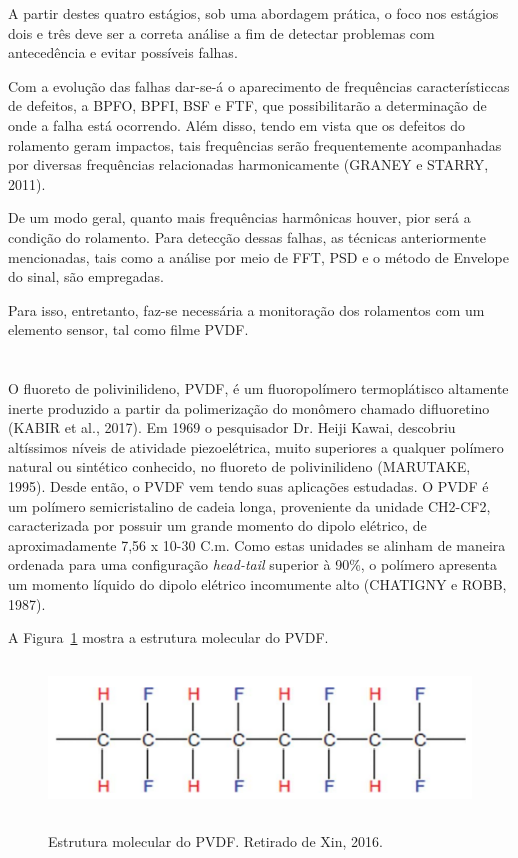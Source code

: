 \documentclass[
	12pt,				
	oneside,			
	a4paper,			
	english,			
	brazil,			
	]{abntex2ppgsi}
\begin{document}
A partir destes quatro estágios, sob uma abordagem prática, o foco nos estágios dois e três deve ser a correta análise a fim de detectar problemas com antecedência e evitar possíveis falhas. 

Com a evolução das falhas dar-se-á o aparecimento de frequências característiccas de defeitos, a BPFO, BPFI, BSF e FTF, que possibilitarão a determinação de onde a falha está ocorrendo. Além disso, tendo em vista que os defeitos do rolamento geram impactos, tais frequências serão frequentemente acompanhadas por diversas frequências relacionadas harmonicamente (GRANEY e STARRY, 2011). 

De um modo geral, quanto mais frequências harmônicas houver, pior será a condição do rolamento. Para detecção dessas falhas, as técnicas anteriormente mencionadas, tais como a análise por meio de FFT, PSD e o método de Envelope do sinal, são empregadas. 

Para isso, entretanto, faz-se necessária a monitoração dos rolamentos com um elemento sensor, tal como filme PVDF.

\newpage
\section{}
\label{secao:PVDF}

O fluoreto de polivinilideno, PVDF, é um fluoropolímero termoplátisco altamente inerte produzido a partir da polimerização do monômero chamado difluoretino (KABIR et al., 2017). Em 1969 o pesquisador Dr. Heiji Kawai, descobriu altíssimos níveis de atividade piezoelétrica, muito superiores a qualquer polímero natural ou sintético conhecido, no fluoreto de polivinilideno (MARUTAKE, 1995). Desde então, o PVDF vem tendo suas aplicações estudadas. O PVDF é um polímero semicristalino de cadeia longa, proveniente da unidade CH2-CF2, caracterizada por possuir um grande momento do dipolo elétrico, de aproximadamente 7,56 x 10-30 C.m. Como estas unidades se alinham de maneira ordenada para uma configuração \textit{head-tail} superior à 90\%, o polímero apresenta um momento líquido do dipolo elétrico incomumente alto (CHATIGNY e ROBB, 1987).

A Figura~\ref{pvdf_cadeia} mostra a estrutura molecular do PVDF.

\begin{figure}[H]
\centering
\caption {Estrutura molecular do PVDF. Retirado de Xin, 2016.}
\includegraphics[width=\textwidth,height=40mm,keepaspectratio]{pvdf_cadeia}
\label{pvdf_cadeia}
\end{figure}
\end{document}
